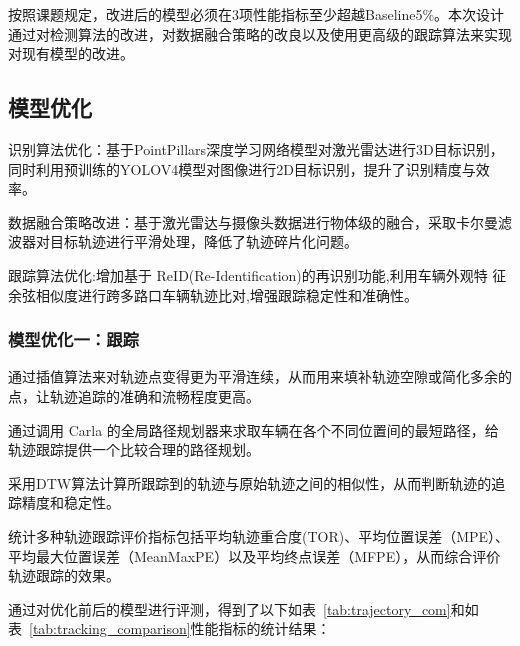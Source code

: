 按照课题规定，改进后的模型必须在3项性能指标至少超越Baseline5\%。本次设计通过对检测算法的改进，对数据融合策略的改良以及使用更高级的跟踪算法来实现对现有模型的改进。







\subsection{模型优化}

识别算法优化：基于PointPillars深度学习网络模型对激光雷达进行3D目标识别，同时利用预训练的YOLOV4模型对图像进行2D目标识别，提升了识别精度与效率。


数据融合策略改进：基于激光雷达与摄像头数据进行物体级的融合，采取卡尔曼滤波器对目标轨迹进行平滑处理，降低了轨迹碎片化问题。


跟踪算法优化:增加基于 ReID(Re-Identification)的再识别功能,利用车辆外观特 征余弦相似度进行跨多路口车辆轨迹比对,增强跟踪稳定性和准确性。

\subsubsection{模型优化一：跟踪}

通过插值算法来对轨迹点变得更为平滑连续，从而用来填补轨迹空隙或简化多余的点，让轨迹追踪的准确和流畅程度更高。

通过调用 Carla 的全局路径规划器来求取车辆在各个不同位置间的最短路径，给轨迹跟踪提供一个比较合理的路径规划。

采用DTW算法计算所跟踪到的轨迹与原始轨迹之间的相似性，从而判断轨迹的追踪精度和稳定性。

统计多种轨迹跟踪评价指标包括平均轨迹重合度(TOR)、平均位置误差（MPE）、平均最大位置误差（MeanMaxPE）以及平均终点误差（MFPE），从而综合评价轨迹跟踪的效果。

通过对优化前后的模型进行评测，得到了以下如表~\ref{tab:trajectory_com}和如表~\ref{tab:tracking_comparison}性能指标的统计结果：

